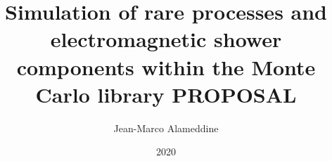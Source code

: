 \documentclass[
  tucolor,       %
  BCOR=12mm,     %
  parskip=half,  %
  open=any,      %
  cleardoublepage=plain,  %
]{tudothesis}
\author{Jean-Marco Alameddine}
\title{Simulation of rare processes and electromagnetic shower components within the Monte Carlo library PROPOSAL}
\date{2020}
\begin{document}
\frontmatter
\maketitle

\makecorrectorpage


\tableofcontents

\mainmatter






\appendix


\backmatter
\printbibliography

\cleardoublepage

\end{document}
